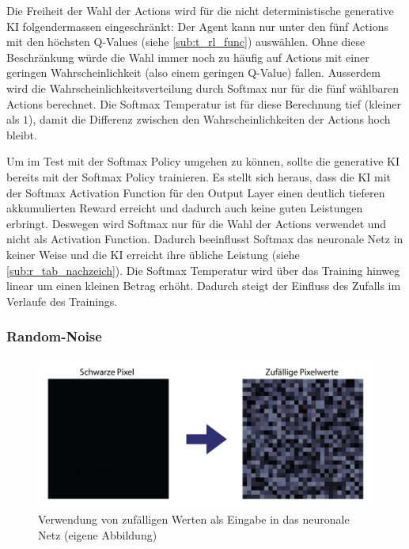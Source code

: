 Die Freiheit der Wahl der Actions wird für die nicht deterministische generative
KI folgendermassen eingeschränkt: Der Agent kann nur unter den fünf Actions mit
den höchsten Q-Values (siehe \ref{sub:t_rl_func}) auswählen. Ohne diese
Beschränkung würde die Wahl immer noch zu häufig auf Actions mit einer geringen
Wahrscheinlichkeit (also einem geringen Q-Value) fallen. Ausserdem wird die
Wahrscheinlichkeitsverteilung durch Softmax nur für die fünf wählbaren Actions
berechnet. Die Softmax Temperatur ist für diese Berechnung tief (kleiner als
$1$), damit die Differenz zwischen den Wahrscheinlichkeiten der Actions hoch
bleibt.

Um im Test mit der Softmax Policy umgehen zu können, sollte die generative KI
bereits mit der Softmax Policy trainieren. Es stellt sich heraus, dass die KI
mit der Softmax Activation Function für den Output Layer einen deutlich tieferen
akkumulierten Reward erreicht und dadurch auch keine guten Leistungen erbringt.
Deswegen wird Softmax nur für die Wahl der Actions verwendet und nicht als
Activation Function. Dadurch beeinflusst Softmax das neuronale Netz in keiner
Weise und die KI erreicht ihre übliche Leistung (siehe
\ref{sub:r_tab_nachzeich}). Die Softmax Temperatur wird über das Training
hinweg linear um einen kleinen Betrag erhöht. Dadurch steigt der Einfluss des
Zufalls im Verlaufe des Trainings.

\subsubsection*{Random-Noise}

\begin{figure}[!ht]
 \centering
 \includegraphics[width=\textwidth]{images/methode/noisypixel.png}
 \caption{Verwendung von zufälligen Werten als Eingabe in das neuronale Netz
 (eigene Abbildung)}\label{fig:noisy-pixel}
\end{figure}

